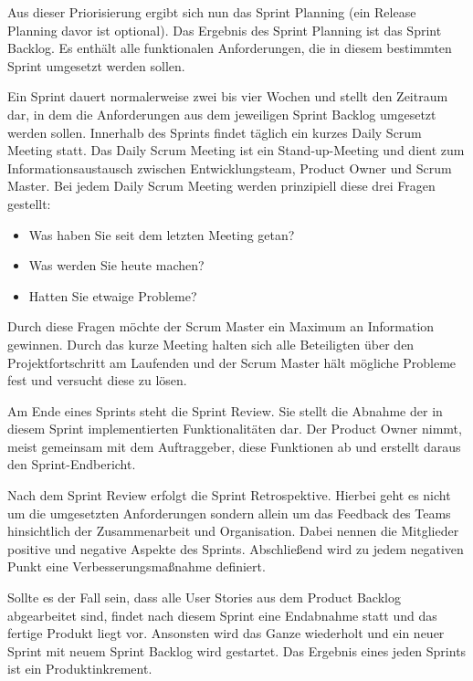 \newpage

Aus dieser Priorisierung ergibt sich nun das Sprint Planning (ein Release Planning davor ist optional). Das Ergebnis des Sprint Planning ist das Sprint Backlog. Es enthält alle funktionalen Anforderungen, die in diesem bestimmten Sprint umgesetzt werden sollen.

Ein Sprint dauert normalerweise zwei bis vier Wochen und stellt den Zeitraum dar, in dem die Anforderungen aus dem jeweiligen Sprint Backlog umgesetzt werden sollen. Innerhalb des Sprints findet täglich ein kurzes Daily Scrum Meeting statt. Das Daily Scrum Meeting ist ein Stand-up-Meeting und dient zum Informationsaustausch zwischen Entwicklungsteam, Product Owner und Scrum Master. Bei jedem Daily Scrum Meeting werden prinzipiell diese drei Fragen gestellt:
\begin{itemize}
\item Was haben Sie seit dem letzten Meeting getan?
\item Was werden Sie heute machen?
\item Hatten Sie etwaige Probleme?
\end{itemize}

Durch diese Fragen möchte der Scrum Master ein Maximum an Information gewinnen. Durch das kurze Meeting halten sich alle Beteiligten über den Projektfortschritt am Laufenden und der Scrum Master hält mögliche Probleme fest und versucht diese zu lösen.

Am Ende eines Sprints steht die Sprint Review. Sie stellt die Abnahme der in diesem Sprint implementierten Funktionalitäten dar. Der Product Owner nimmt, meist gemeinsam mit dem Auftraggeber, diese Funktionen ab und erstellt daraus den Sprint-Endbericht.

Nach dem Sprint Review erfolgt die Sprint Retrospektive. Hierbei geht es nicht um die umgesetzten Anforderungen sondern allein um das Feedback des Teams hinsichtlich der Zusammenarbeit und Organisation. Dabei nennen die Mitglieder positive und negative Aspekte des Sprints. Abschließend wird zu jedem negativen Punkt eine Verbesserungsmaßnahme definiert.

Sollte es der Fall sein, dass alle User Stories aus dem Product Backlog abgearbeitet sind, findet nach diesem Sprint eine Endabnahme statt und das fertige Produkt liegt vor. Ansonsten wird das Ganze wiederholt und ein neuer Sprint mit neuem Sprint Backlog wird gestartet. Das Ergebnis eines jeden Sprints ist ein Produktinkrement.


